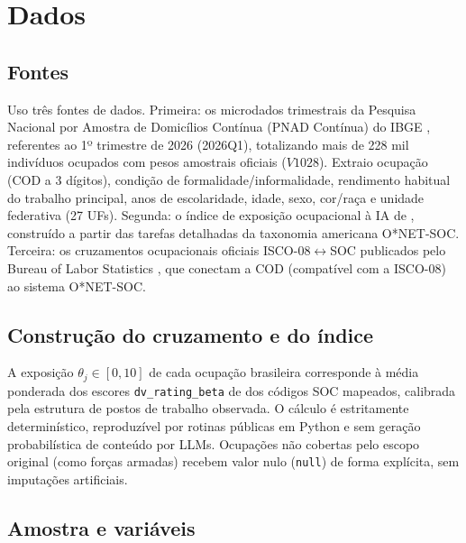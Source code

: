 \section{Dados}
\label{sec:dados}

\subsection{Fontes}

Uso três fontes de dados. Primeira: os microdados trimestrais da Pesquisa Nacional por Amostra de Domicílios Contínua (PNAD Contínua) do IBGE \citep{ibgepnad}, referentes ao 1º trimestre de 2026 (2026Q1), totalizando mais de 228 mil indivíduos ocupados com pesos amostrais oficiais ($V1028$). Extraio ocupação (COD a 3 dígitos), condição de formalidade/informalidade, rendimento habitual do trabalho principal, anos de escolaridade, idade, sexo, cor/raça e unidade federativa (27 UFs). Segunda: o índice de exposição ocupacional à IA de \citet{eloundou2024gpts}, construído a partir das tarefas detalhadas da taxonomia americana O*NET-SOC. Terceira: os cruzamentos ocupacionais oficiais ISCO-08$\leftrightarrow$SOC publicados pelo Bureau of Labor Statistics \citep{blscrosswalk}, que conectam a COD (compatível com a ISCO-08) ao sistema O*NET-SOC.

\subsection{Construção do cruzamento e do índice}

A exposição $\theta_j \in [0,10]$ de cada ocupação brasileira corresponde à média ponderada dos escores \texttt{dv\_rating\_beta} de \citet{eloundou2024gpts} dos códigos SOC mapeados, calibrada pela estrutura de postos de trabalho observada. O cálculo é estritamente determinístico, reproduzível por rotinas públicas em Python e sem geração probabilística de conteúdo por LLMs. Ocupações não cobertas pelo escopo original (como forças armadas) recebem valor nulo (\texttt{null}) de forma explícita, sem imputações artificiais.

\subsection{Amostra e variáveis}

